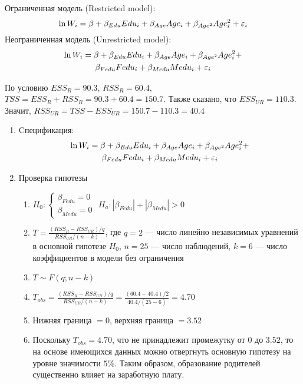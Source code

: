\documentclass[pdftex,11pt,openany]{book}\usepackage[]{graphicx}\usepackage[]{color}
\begin{document}
\begin{solution}

Ограниченная модель (Restricted model):
\[
\ln W_i = \beta + \beta_{Edu}Edu_i + \beta_{Age}Age_i + \beta_{Age^2}Age^2_i + \varepsilon_i
\]
Неограниченная модель (Unrestricted model):
\begin{multline}
\ln W_i = \beta + \beta_{Edu}Edu_i + \beta_{Age}Age_i + \beta_{Age^2}Age^2_i + \\
\beta_{Fedu}Fedu_i + \beta_{Medu}Medu_i + \varepsilon_i
\end{multline}

По условию $ESS_R = 90.3$, $RSS_R = 60.4$, $TSS = ESS_R + RSS_R = 90.3 + 60.4 = 150.7.$ Также сказано, что $ESS_{UR} = 110.3$. Значит, $RSS_{UR} = TSS - ESS_{UR} = 150.7 - 110.3 = 40.4$
\begin{enumerate}
\item Cпецификация:
\begin{multline}
\ln W_i = \beta + \beta_{Edu}Edu_i + \beta_{Age}Age_i + \beta_{Age^2}Age^2_i + \\
\beta_{Fedu}Fedu_i + \beta_{Medu}Medu_i + \varepsilon_i
\end{multline}
\item Проверка гипотезы
\begin{enumerate}
\item $H_0: \begin{cases} \beta_{Fedu} = 0  \\  \beta_{Medu} = 0 \end{cases}$
$H_a: |\beta_{Fedu}| + |\beta_{Medu}| > 0$
\item $T = \frac{(RSS_{R} - RSS_{UR})/q}{RSS_{UR}/(n - k)}$, где $q = 2$ --- число линейно независимых уравнений в основной гипотезе $H_0$, $n = 25$ --- число наблюдений, $k = 6$ --- число коэффициентов в модели без ограничения
\item $T \sim F(q; n - k)$
\item $T_{obs} = \frac{(RSS_{R} - RSS_{UR})/q}{RSS_{UR}/(n - k)} = \frac{(60.4 - 40.4)/2}{40.4/(25 - 6)} = 4.70$
\item Нижняя граница $= 0$, верхняя граница $= 3.52$
\item Поскольку $T_{obs} = 4.70$, что не принадлежит промежутку от $0$ до $3.52$, то на основе имеющихся данных можно отвергнуть основную гипотезу на уровне значимости $5\%$. Таким образом, образование родителей существенно влияет на заработную плату.
\end{enumerate}
\end{enumerate}

\end{solution}
\end{document}
